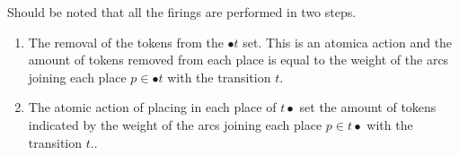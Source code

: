 	Should be noted that all the firings are performed in two steps.
	\begin{enumerate}
		\item The removal of the tokens from the $\bullet t$ set. This is an atomica action and the amount
			of tokens removed from each place is equal to the weight of the arcs joining each place $p \in
			\bullet t$ with the transition $t$.
		\item The atomic action of placing in each place of $t \bullet$ set the amount of tokens indicated
			by the weight of the arcs joining each place $p \in t \bullet$ with the transition $t$..
	\end{enumerate}
	